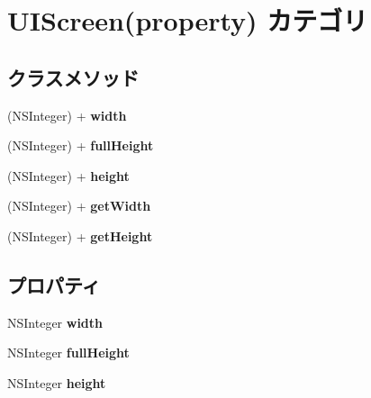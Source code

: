 \hypertarget{category_u_i_screen_07property_08}{}\section{U\+I\+Screen(property) カテゴリ}
\label{category_u_i_screen_07property_08}
\subsection*{クラスメソッド}
\begin{DoxyCompactItemize}
\item 
\hypertarget{category_u_i_screen_07property_08_abc0fab1da026af903557efea76d85aaa}{}(N\+S\+Integer) + {\bfseries width}\label{category_u_i_screen_07property_08_abc0fab1da026af903557efea76d85aaa}

\item 
\hypertarget{category_u_i_screen_07property_08_a52e827b242e0d33a2da1272b47ffc512}{}(N\+S\+Integer) + {\bfseries full\+Height}\label{category_u_i_screen_07property_08_a52e827b242e0d33a2da1272b47ffc512}

\item 
\hypertarget{category_u_i_screen_07property_08_aa7bb0c7db61dfd6b357f63582da66e6b}{}(N\+S\+Integer) + {\bfseries height}\label{category_u_i_screen_07property_08_aa7bb0c7db61dfd6b357f63582da66e6b}

\item 
\hypertarget{category_u_i_screen_07property_08_a61a1f4e3c4e540f0697278ac56d2d17f}{}(N\+S\+Integer) + {\bfseries get\+Width}\label{category_u_i_screen_07property_08_a61a1f4e3c4e540f0697278ac56d2d17f}

\item 
\hypertarget{category_u_i_screen_07property_08_ab5c258737ef95d4aadc3bba2b121a6ca}{}(N\+S\+Integer) + {\bfseries get\+Height}\label{category_u_i_screen_07property_08_ab5c258737ef95d4aadc3bba2b121a6ca}

\end{DoxyCompactItemize}
\subsection*{プロパティ}
\begin{DoxyCompactItemize}
\item 
\hypertarget{category_u_i_screen_07property_08_acb8def2b184b99dd7387b21d031246c1}{}N\+S\+Integer {\bfseries width}\label{category_u_i_screen_07property_08_acb8def2b184b99dd7387b21d031246c1}

\item 
\hypertarget{category_u_i_screen_07property_08_a1a9ec99ad0850189f611a89ee40fe66c}{}N\+S\+Integer {\bfseries full\+Height}\label{category_u_i_screen_07property_08_a1a9ec99ad0850189f611a89ee40fe66c}

\item 
\hypertarget{category_u_i_screen_07property_08_a5bcc4108f47bd502445ff1db1bcd50f4}{}N\+S\+Integer {\bfseries height}\label{category_u_i_screen_07property_08_a5bcc4108f47bd502445ff1db1bcd50f4}

\end{DoxyCompactItemize}


